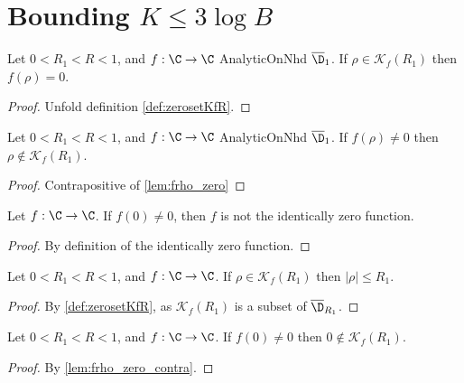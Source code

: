 \section{Bounding $K\le 3\log B$}

\begin{lemma} \label{lem:frho_zero}  \leanok
Let $0<R_1<R<1$, and $f:\C\to\C$ AnalyticOnNhd $\overline{\D}_1$. If $\rho\in \mathcal K_f(R_1)$ then $f(\rho)=0$.
\end{lemma}
\begin{proof} \leanok
{}
Unfold definition \ref{def:zerosetKfR}.
\end{proof}

\begin{lemma} \label{lem:frho_zero_contra}  \leanok
Let $0<R_1<R<1$, and $f:\C\to\C$ AnalyticOnNhd $\overline{\D}_1$. If $f(\rho)\neq 0$ then $\rho\notin \mathcal K_f(R_1)$.
\end{lemma}
\begin{proof} \leanok
{}
Contrapositive of \cref{lem:frho_zero}
\end{proof}

\begin{lemma}\label{lem:f_is_nonzero}  \leanok
Let $f:\C\to\C$. If $f(0)\neq0$, then $f$ is not the identically zero function.
\end{lemma}
\begin{proof} \leanok

By definition of the identically zero function.
\end{proof}

\begin{lemma}\label{lem:rho_in_disk_R1} \leanok {}
Let $0<R_1<R<1$, and $f:\C\to\C$. If $\rho\in \mathcal K_f(R_1)$ then $|\rho|\le R_1$.
\end{lemma}
\begin{proof} \leanok
{}
By \cref{def:zerosetKfR}, as $\mathcal{K}_f(R_1)$ is a subset of $\overline{\D}_{R_1}$.
\end{proof}

\begin{lemma}\label{lem:zero_not_in_Kf} \leanok {}
Let $0<R_1<R<1$, and $f:\C\to\C$. If $f(0)\neq0$ then $0\notin \mathcal K_f(R_1)$.
\end{lemma}
\begin{proof} \leanok
{}
By \cref{lem:frho_zero_contra}.
\end{proof}

